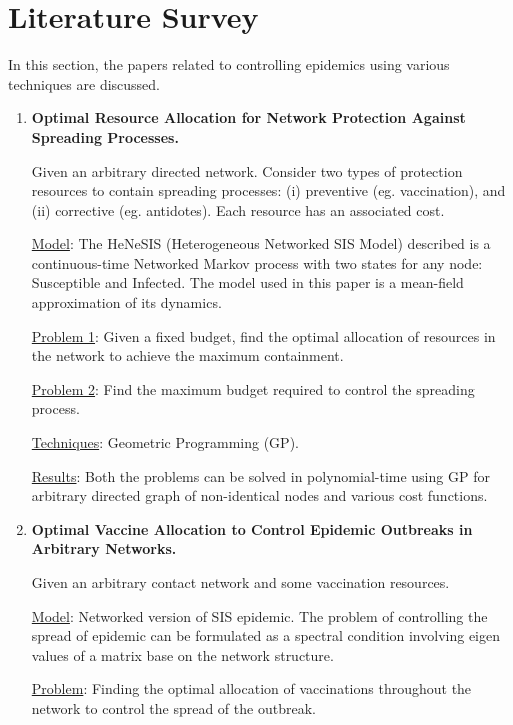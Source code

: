 \section{Literature Survey}
In this section, the papers related to controlling epidemics using various techniques are discussed.

\begin{enumerate}
\item \textbf{Optimal Resource Allocation for Network Protection Against Spreading Processes.} 
\cite{PreciadoVM14}

\smallskip
\noindent
Given an arbitrary directed network. Consider two types of protection resources to contain spreading processes: (i) preventive (eg. vaccination), and (ii) corrective (eg. antidotes). Each resource has an associated cost.

\smallskip
\noindent
\underline{Model}: The HeNeSIS (Heterogeneous Networked SIS Model) described is a continuous-time Networked Markov process with two states for any node: Susceptible and Infected. The model used in this paper is a mean-field approximation of its dynamics.

\smallskip
\noindent
\underline{Problem 1}: Given a fixed budget, find the optimal allocation of resources in the network to achieve the maximum containment.

\medskip
\noindent
\underline{Problem 2}: Find the maximum budget required to control the spreading process.

\smallskip
\noindent
\underline{Techniques}: Geometric Programming (GP).

\smallskip
\noindent
\underline{Results}: Both the problems can be solved in polynomial-time using GP for arbitrary directed graph of non-identical nodes and various cost functions.

\item \textbf{Optimal Vaccine Allocation to Control Epidemic Outbreaks in Arbitrary Networks.} \cite{PreciadoVM13}

\smallskip
\noindent
Given an arbitrary contact network and some vaccination resources. 

\smallskip
\noindent
\underline{Model}: Networked version of SIS epidemic. The problem of controlling the spread of epidemic can be formulated as a spectral condition involving eigen values of a matrix base on the network structure.

\smallskip
\noindent
\underline{Problem}: Finding the optimal allocation of vaccinations throughout the network to control the spread of the outbreak.


\end{enumerate}
